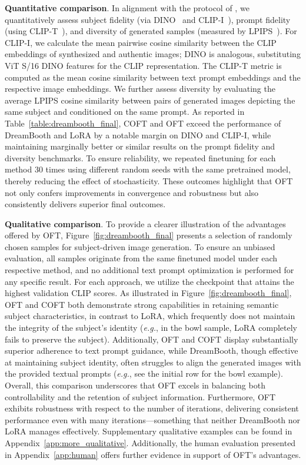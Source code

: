 \textbf{Quantitative comparison}. In alignment with the protocol of \cite{ruiz2023dreambooth}, we quantitatively assess subject fidelity (via DINO~\cite{caron2021emerging} and CLIP-I~\cite{radford2021learning}), prompt fidelity (using CLIP-T~\cite{radford2021learning}), and diversity of generated samples (measured by LPIPS~\cite{zhang2018unreasonable}). For CLIP-I, we calculate the mean pairwise cosine similarity between the CLIP embeddings of synthesized and authentic images; DINO is analogous, substituting ViT S/16 DINO features for the CLIP representation. The CLIP-T metric is computed as the mean cosine similarity between text prompt embeddings and the respective image embeddings. We further assess diversity by evaluating the average LPIPS cosine similarity between pairs of generated images depicting the same subject and conditioned on the same prompt. As reported in Table~\ref{table:dreambooth_final}, COFT and OFT exceed the performance of DreamBooth and LoRA by a notable margin on DINO and CLIP-I, while maintaining marginally better or similar results on the prompt fidelity and diversity benchmarks. To ensure reliability, we repeated finetuning for each method 30 times using different random seeds with the same pretrained model, thereby reducing the effect of stochasticity. These outcomes highlight that OFT not only confers improvements in convergence and robustness but also consistently delivers superior final outcomes.

\textbf{Qualitative comparison}. To provide a clearer illustration of the advantages offered by OFT, Figure~\ref{fig:dreambooth_final} presents a selection of randomly chosen samples for subject-driven image generation. To ensure an unbiased evaluation, all samples originate from the same finetuned model under each respective method, and no additional text prompt optimization is performed for any specific result. For each approach, we utilize the checkpoint that attains the highest validation CLIP scores. As illustrated in Figure~\ref{fig:dreambooth_final}, OFT and COFT both demonstrate strong capabilities in retaining semantic subject characteristics, in contrast to LoRA, which frequently does not maintain the integrity of the subject's identity (\emph{e.g.}, in the bowl sample, LoRA completely fails to preserve the subject). Additionally, OFT and COFT display substantially superior adherence to text prompt guidance, while DreamBooth, though effective at maintaining subject identity, often struggles to align the generated images with the provided textual prompts (\emph{e.g.}, see the initial row for the bowl example). Overall, this comparison underscores that OFT excels in balancing both controllability and the retention of subject information. Furthermore, OFT exhibits robustness with respect to the number of iterations, delivering consistent performance even with many iterations—something that neither DreamBooth nor LoRA manages effectively. Supplementary qualitative examples can be found in Appendix~\ref{app:more_qualitative}. Additionally, the human evaluation presented in Appendix~\ref{app:human} offers further evidence in support of OFT’s advantages.

